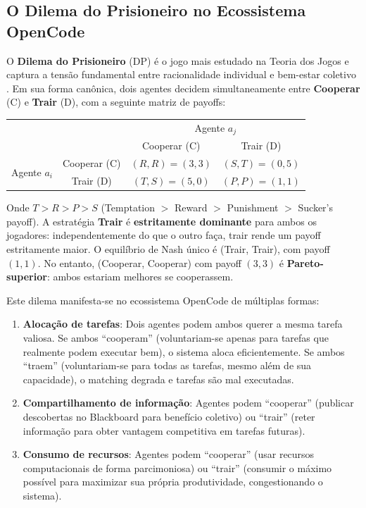 \subsection{O Dilema do Prisioneiro no Ecossistema OpenCode}

O \textbf{Dilema do Prisioneiro} (DP) é o jogo mais estudado na Teoria dos Jogos e captura a tensão fundamental entre racionalidade individual e bem-estar coletivo \cite{axelrod1984evolution}. Em sua forma canônica, dois agentes decidem simultaneamente entre \textbf{Cooperar} (C) e \textbf{Trair} (D), com a seguinte matriz de payoffs:

\begin{center}
\begin{tabular}{cc|c|c|}
& & \multicolumn{2}{c|}{Agente $a_j$} \\
& & Cooperar (C) & Trair (D) \\
\hline
\multirow{2}{*}{Agente $a_i$} & Cooperar (C) & $(R, R) = (3,3)$ & $(S, T) = (0,5)$ \\
\cline{2-4}
& Trair (D) & $(T, S) = (5,0)$ & $(P, P) = (1,1)$ \\
\hline
\end{tabular}
\end{center}

Onde $T > R > P > S$ (Temptation $>$ Reward $>$ Punishment $>$ Sucker's payoff). A estratégia \textbf{Trair} é \textbf{estritamente dominante} para ambos os jogadores: independentemente do que o outro faça, trair rende um payoff estritamente maior. O equilíbrio de Nash único é (Trair, Trair), com payoff $(1,1)$. No entanto, (Cooperar, Cooperar) com payoff $(3,3)$ é \textbf{Pareto-superior}: ambos estariam melhores se cooperassem.

Este dilema manifesta-se no ecossistema OpenCode de múltiplas formas:

\begin{enumerate}
    \item \textbf{Alocação de tarefas}: Dois agentes podem ambos querer a mesma tarefa valiosa. Se ambos ``cooperam'' (voluntariam-se apenas para tarefas que realmente podem executar bem), o sistema aloca eficientemente. Se ambos ``traem'' (voluntariam-se para todas as tarefas, mesmo além de sua capacidade), o matching degrada e tarefas são mal executadas.
    
    \item \textbf{Compartilhamento de informação}: Agentes podem ``cooperar'' (publicar descobertas no Blackboard para benefício coletivo) ou ``trair'' (reter informação para obter vantagem competitiva em tarefas futuras).
    
    \item \textbf{Consumo de recursos}: Agentes podem ``cooperar'' (usar recursos computacionais de forma parcimoniosa) ou ``trair'' (consumir o máximo possível para maximizar sua própria produtividade, congestionando o sistema).
\end{enumerate}

